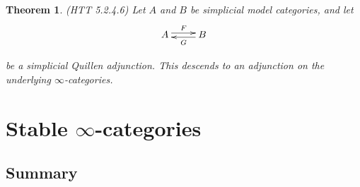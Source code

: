 \documentclass[letterpaper]{article}
\newtheorem{theorem}{Theorem}
\theoremstyle{definition}
\begin{document}
\begin{theorem}(HTT 5.2.4.6)
Let $A$ and $B$ be simplicial model categories, and let
\[
\xymatrix{A \ar@<.5ex>[r]^F & \ar@<.5ex>[l]^G B}
\]

be a simplicial Quillen adjunction. This descends to an adjunction on
the underlying $\infty$-categories.
\end{theorem}








\section{Stable $\infty$-categories}

\subsection{Summary}
\end{document}

